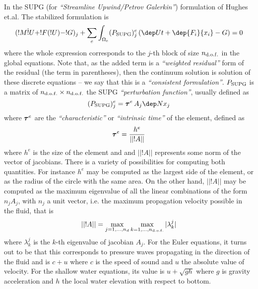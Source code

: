 In the SUPG (for \emph{``Streamline Upwind/Petrov Galerkin''})
formulation of Hughes et.al. The stabilized formulation is
%
\begin{equation}\label{eq:supg} 
   (!M \dot !U + !F(!U) - !G)_j
       + \sum_e \int_{\Omega_e} (\Psupg)^e_j \, (\dep Ut+\dep
       {F_i}{x_i} -G) = 0
\end{equation}
%
%
where the whole expression corresponds to the $j$-th block of size
${n_{\mathrm{d.o.f.}}}$ in the global equations.  Note that, as the added term is a
\emph{``weighted residual''} form of the residual (the term in
parentheses), then the continuum solution is solution of these
discrete equations -- we say that this is a \emph{``consistent
formulation''}. ${P_\mathrm{SUPG}}$ is a matrix of ${n_{\mathrm{d.o.f.}}}\times{n_{\mathrm{d.o.f.}}}$ the SUPG
\emph{``perturbation function''}, usually defined as
%
\begin{equation} 
  (\Psupg)^e_j = \btau^e \, A_j \dep N{x_j}
\end{equation}
%
where $\boldsymbol{\tau}^e$ are the \emph{``characteristic''} or \emph{``intrinsic
time''} of the element, defined as 
%
\begin{equation} 
  \boldsymbol{\tau}^e = \frac{h^e}{||!A||}
\end{equation}
%
where $h^e$ is the size of the element and and $||!A||$ represents
some norm of the vector of jacobians. There is a variety of
possibilities for computing both quantities. For instance $h^e$ may be
computed as the largest side of the element, or as the radius of the
circle with the same area. On the other hand, $||!A||$ may be computed
as the maximum eigenvalue of all the linear combinations of the form
$n_jA_j$, with $n_j$ a unit vector, i.e. the maximum propagation
velocity possible in the fluid, that is
%
\begin{equation}\label{eq:lammax} 
    ||!A|| = \max_{j=1,...,{n_d}} \max_{k=1,...,{n_{\mathrm{d.o.f.}}}} |\lambda^j_k|
\end{equation}
%
where $\lambda^j_k$ is the $k$-th eigenvalue of jacobian $A_j$.  For
the Euler equations, it turns out to be that this corresponds to
pressure waves propagating in the direction of the fluid and is $c+u$
where $c$ is the speed of sound and $u$ the absolute value of
velocity. For the shallow water equations, its value is $u+\sqrt{gh}$
where $g$ is gravity acceleration and $h$ the local water elevation
with respect to bottom. 

\label{sec:shockcap} 

